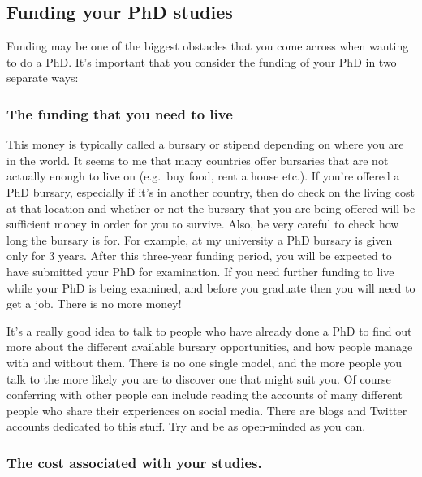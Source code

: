 \documentclass[
]{krantz}
\begin{document}
\hypertarget{funding-your-phd-studies}{%
\subsection{Funding your PhD studies}\label{funding-your-phd-studies}}

Funding may be one of the biggest obstacles that you come across when wanting to do a PhD. It's important that you consider the funding of your PhD in two separate ways:

\hypertarget{the-funding-that-you-need-to-live}{%
\subsubsection{The funding that you need to live}\label{the-funding-that-you-need-to-live}}

This money is typically called a bursary or stipend depending on where you are in the world. It seems to me that many countries offer bursaries that are not actually enough to live on (e.g.~buy food, rent a house etc.). If you're offered a PhD bursary, especially if it's in another country, then do check on the living cost at that location and whether or not the bursary that you are being offered will be sufficient money in order for you to survive. Also, be very careful to check how long the bursary is for. For example, at my university a PhD bursary is given only for 3 years. After this three-year funding period, you will be expected to have submitted your PhD for examination. If you need further funding to live while your PhD is being examined, and before you graduate then you will need to get a job. There is no more money!

It's a really good idea to talk to people who have already done a PhD to find out more about the different available bursary opportunities, and how people manage with and without them. There is no one single model, and the more people you talk to the more likely you are to discover one that might suit you. Of course conferring with other people can include reading the accounts of many different people who share their experiences on social media. There are blogs and Twitter accounts dedicated to this stuff. Try and be as open-minded as you can.

\hypertarget{the-cost-associated-with-your-studies.}{%
\subsubsection{The cost associated with your studies.}\label{the-cost-associated-with-your-studies.}}
\end{document}
